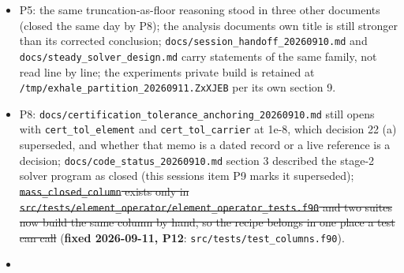 \documentclass[english,a4paper]{my_memo}
\begin{document}
\begin{itemize}
  P4: the kind-generic rows do not form the equilibrium pressure term
  themselves (closed from \texttt{assemble\_residual}, but the two places must stay
  one expression if the arm is ever made to write its own face data back);
  \st{the default path\textquotesingle s PLM momentum scale carries a coordinate artifact, the
  geometric pressure term \mbox{\texttt{(A+\ -\ A-)\ p\_j/dV}} entering the max separately
  although it is one physical term with the flux divergence, so at zero
  gravity with a uniform pressure the scale is \mbox{\texttt{2\ p/r}} where the physical
  force is zero (MEASURED: the arm\textquotesingle s scale, which is the row\textquotesingle s true content,
  sits 0.944 below the base scheme\textquotesingle s for both Riemann solvers at every N;
  under WENO3 the two agree to 2E-13). Fixing it moves the default momentum
  measure at every cell and therefore the acceptance of every recorded
  state, so it is a user decision.} (\textbf{fixed 2026-09-11, P11}, on the
  user\textquotesingle s instruction: the scale is now the largest of the three physical
  terms, the zero-gravity artifact reads 2.22507E-308 in place of 1.000, and
  the acceptance movement is measured, \texttt{wasp\_full\_newton} still CERTIFIED.)
\item
  P5: the same truncation-as-floor reasoning stood in three other documents
  (closed the same day by P8); the analysis document\textquotesingle s own title is still
  stronger than its corrected conclusion; \texttt{docs/session\_handoff\_20260910.md}
  and \texttt{docs/steady\_solver\_design.md} carry statements of the same family,
  not read line by line; the experiment\textquotesingle s private build is retained at
  \texttt{/tmp/exhale\_partition\_20260911.ZxXJEB} per its own section 9.
\item
  P8: \texttt{docs/certification\_tolerance\_anchoring\_20260910.md} still opens with
  \texttt{cert\_tol\_element} and \texttt{cert\_tol\_carrier} at 1e-8, which decision 22 (a)
  superseded, and whether that memo is a dated record or a live reference is
  a decision; \texttt{docs/code\_status\_20260910.md} section 3 described the
  stage-2 solver program as closed (this session\textquotesingle s item P9 marks it
  superseded); \st{\mbox{\texttt{mass\_closed\_column}} exists only in
  \mbox{\texttt{src/tests/element\_operator/element\_operator\_tests.f90}} and two suites now
  build the same column by hand, so the recipe belongs in one place a test
  can call} (\textbf{fixed 2026-09-11, P12}: \texttt{src/tests/test\_columns.f90}).
\item

\end{itemize}
\end{document}
